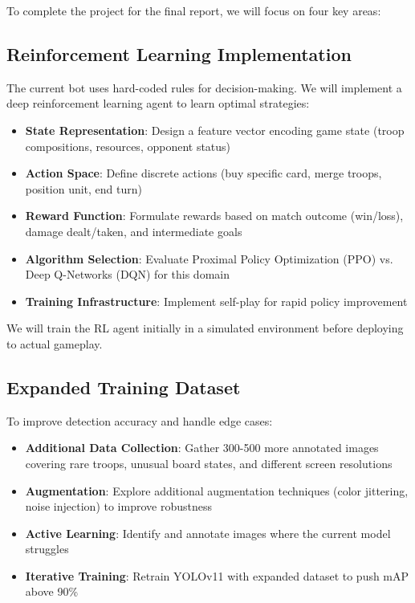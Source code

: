 \documentclass[12pt]{article}
\begin{document}
To complete the project for the final report, we will focus on four key areas:

\subsection{Reinforcement Learning Implementation}

The current bot uses hard-coded rules for decision-making. We will implement a deep reinforcement learning agent to learn optimal strategies:

\begin{itemize}
    \item \textbf{State Representation}: Design a feature vector encoding game state (troop compositions, resources, opponent status)
    \item \textbf{Action Space}: Define discrete actions (buy specific card, merge troops, position unit, end turn)
    \item \textbf{Reward Function}: Formulate rewards based on match outcome (win/loss), damage dealt/taken, and intermediate goals
    \item \textbf{Algorithm Selection}: Evaluate Proximal Policy Optimization (PPO) vs. Deep Q-Networks (DQN) for this domain
    \item \textbf{Training Infrastructure}: Implement self-play for rapid policy improvement
\end{itemize}

We will train the RL agent initially in a simulated environment before deploying to actual gameplay.

\subsection{Expanded Training Dataset}

To improve detection accuracy and handle edge cases:

\begin{itemize}
    \item \textbf{Additional Data Collection}: Gather 300-500 more annotated images covering rare troops, unusual board states, and different screen resolutions
    \item \textbf{Augmentation}: Explore additional augmentation techniques (color jittering, noise injection) to improve robustness
    \item \textbf{Active Learning}: Identify and annotate images where the current model struggles
    \item \textbf{Iterative Training}: Retrain YOLOv11 with expanded dataset to push mAP above 90\%
\end{itemize}
\end{document}
